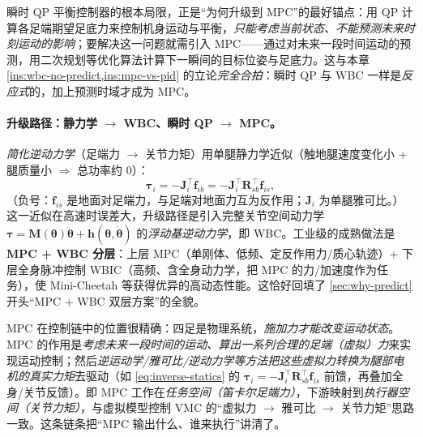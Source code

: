 \begin{insight}\label{ins:unitree-motivation}
瞬时 QP 平衡控制器的根本局限，正是“为何升级到 MPC”的最好锚点：用 QP 计算各足端期望足底力来控制机身运动与平衡，\emph{只能考虑当前状态、不能预测未来时刻运动的影响}；要解决这一问题就需引入 MPC——通过对未来一段时间运动的预测，用二次规划等优化算法计算下一瞬间的目标位姿与足底力\cite{unitree2023quadruped}。这与本章 \cref{ins:wbc-no-predict,ins:mpc-vs-pid} 的立论\emph{完全合拍}：瞬时 QP 与 WBC 一样是\emph{反应式}的，加上预测时域才成为 MPC。
\end{insight}

\paragraph{升级路径：静力学 $\to$ WBC、瞬时 QP $\to$ MPC。}
\emph{简化逆动力学}（足端力 $\to$ 关节力矩）用单腿静力学近似（触地腿速度变化小 + 腿质量小 $\Rightarrow$ 总功率约 $0$）\cite{unitree2023quadruped}：
\begin{equation}
  \boldsymbol{\tau}_i=-\mathbf{J}_i^\top\mathbf{f}_{ib}=-\mathbf{J}_i^\top\mathbf{R}_{sb}^\top\mathbf{f}_{is},
  \label{eq:inverse-statics}
\end{equation}
（负号：$\mathbf{f}_{is}$ 是地面对足端力，与足端对地面力互为反作用；$\mathbf{J}_i$ 为单腿雅可比。）这一近似在高速时误差大，升级路径是引入完整关节空间动力学 $\boldsymbol{\tau}=\mathbf{M}(\boldsymbol{\theta})\ddot{\boldsymbol{\theta}}+\mathbf{h}(\boldsymbol{\theta},\dot{\boldsymbol{\theta}})$ 的\emph{浮动基逆动力学}，即 WBC\cite{unitree2023quadruped}。工业级的成熟做法是\textbf{MPC + WBC 分层}\cite{kim2019wbic}：上层 MPC（单刚体、低频、定反作用力/质心轨迹）+ 下层全身脉冲控制 WBIC（高频、含全身动力学，把 MPC 的力/加速度作为任务），使 Mini-Cheetah 等获得优异的高动态性能。这恰好回填了 \cref{sec:why-predict} 开头“MPC + WBC 双层方案”的全貌。

\begin{insight}\label{ins:control-stack}
MPC 在控制链中的位置很精确：四足是物理系统，\emph{施加力才能改变运动状态}。MPC 的作用是\emph{考虑未来一段时间的运动、算出一系列合理的足端（虚拟）力}来实现运动控制；然后\emph{逆运动学/雅可比/逆动力学等方法把这些虚拟力转换为腿部电机的真实力矩}去驱动（如 \cref{eq:inverse-statics} 的 $\boldsymbol{\tau}_i=-\mathbf{J}_i^\top\mathbf{R}_{sb}^\top\mathbf{f}_{is}$ 前馈，再叠加全身/关节反馈）。即 MPC 工作在\emph{任务空间（笛卡尔足端力）}，下游映射到\emph{执行器空间（关节力矩）}，与虚拟模型控制 VMC 的“虚拟力 $\to$ 雅可比 $\to$ 关节力矩”思路一致。这条链条把“MPC 输出什么、谁来执行”讲清了。
\end{insight}

